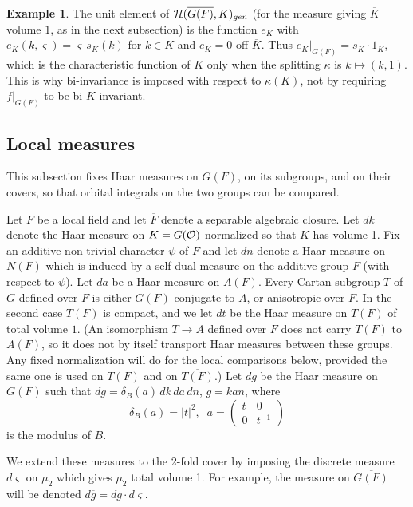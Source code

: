 \documentclass[12pt,letterpaper]{book}
\theoremstyle{plain}
\theoremstyle{definition}
\newtheorem{example}[theorem]{Example}
\theoremstyle{remark}
\theoremstyle{remark}
\begin{document}
\begin{example}
The unit element of ${\cal{H}}(\overline{G(F)},K)_{gen}$ (for the
measure giving $\overline{K}$ volume $1$, as in the next subsection) is
the function $e_K$ with $e_K(k,\varsigma)=\varsigma\, s_K(k)$ for $k\in K$ and
$e_K=0$ off $\overline{K}$. Thus $e_K|_{G(F)}=s_K\cdot 1_K$, which is
the characteristic function of $K$ only when the splitting $\kappa$ is
$k\mapsto(k,1)$. This is why bi-invariance is imposed with respect to
$\kappa(K)$, not by requiring $f|_{G(F)}$ to be bi-$K$-invariant.
\end{example}

\subsection{Local measures}

This subsection fixes Haar measures on $G(F)$, on its subgroups, and on their covers, so that orbital integrals on the two groups can be compared.


Let $F$ be a local field and let $\overline{F}$ denote a separable
algebraic closure.
Let $dk$ denote the Haar measure on $K=G({\cal O})$
normalized so that $K$ has
volume 1. Fix an additive non-trivial character $\psi$ of
$F$ and let $dn$ denote a Haar
measure on $N(F)$ which is induced by a self-dual measure on
the additive group $F$ (with respect to $\psi$).
Let $da$ be a Haar measure on $A(F)$. Every Cartan subgroup $T$ of
$G$ defined over $F$ is either $G(F)$-conjugate to $A$, or anisotropic
over $F$. In the second case $T(F)$ is compact, and we let $dt$ be the
Haar measure on $T(F)$ of total volume $1$. (An isomorphism
$T\rightarrow A$ defined over $\overline{F}$ does not carry $T(F)$ to
$A(F)$, so it does not by itself transport Haar measures between these
groups. Any fixed normalization will do for the local comparisons below, provided
the same one is used on $T(F)$ and on $\overline{T(F)}$.)
Let $dg$ be the Haar measure
on $G(F)$ such that $dg=\delta _B(a)\,dk\,da\,dn$, $g=kan$, where
\begin{equation}
\delta _B(a)=|t|^2,\;\;a=\left(
\begin{array}{cc}
t & 0 \\
0 & t^{-1}
\end{array}
\right)
\end{equation}
is the modulus of $B$.

We extend these measures to the 2-fold cover by imposing the discrete
measure $d\varsigma $ on $\mu _2$ which gives $\mu _2$ total volume 1. For
example, the measure on $\overline{G(F)}$ will be denoted
$d\overline{g}=dg\cdot d\varsigma $.
\end{document}
